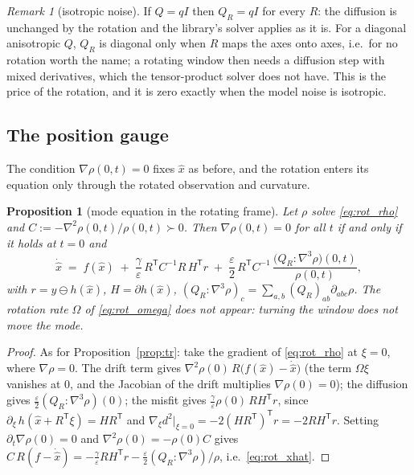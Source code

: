 \documentclass[11pt,a4paper]{article}
\newcommand{\T}{^{\mathsf T}}
\newcommand{\xh}{\hat{x}}
\newcommand{\eps}{\varepsilon}
\newcommand{\grad}{\nabla}
\theoremstyle{plain}
\newtheorem{proposition}{Proposition}
\theoremstyle{definition}
\theoremstyle{remark}
\newtheorem{remark}{Remark}
\begin{document}
\begin{remark}[isotropic noise]
If $Q=qI$ then $Q_R=qI$ for every $R$: the diffusion is unchanged by the rotation and the library's solver applies as it is. For a diagonal anisotropic $Q$, $Q_R$ is diagonal only when $R$ maps the axes onto axes, i.e.\ for no rotation worth the name; a rotating window then needs a diffusion step with mixed derivatives, which the tensor-product solver does not have. This is the price of the rotation, and it is zero exactly when the model noise is isotropic.
\end{remark}

\subsection{The position gauge}

The condition $\grad\rho(0,t)=0$ fixes $\xh$ as before, and the rotation enters its equation only through the rotated observation and curvature.

\begin{proposition}[mode equation in the rotating frame]
\label{prop:rot}
Let $\rho$ solve \eqref{eq:rot_rho} and $C:=-\grad^2\rho(0,t)/\rho(0,t)\succ0$. Then $\grad\rho(0,t)=0$ for all $t$ if and only if it holds at $t=0$ and
\begin{equation}
  \boxed{\;
  \dot{\xh} \;=\; f(\xh) \;+\; \frac\gamma\eps\,R\T C^{-1}R\,H\T r \;+\; \frac\eps2\,R\T C^{-1}\,\frac{\big(Q_R\!:\!\grad^3\rho\big)(0,t)}{\rho(0,t)} ,\;}
  \label{eq:rot_xhat}
\end{equation}
with $r=y\ominus h(\xh)$, $H=\partial h(\xh)$, $(Q_R\!:\!\grad^3\rho)_c=\sum_{a,b}(Q_R)_{ab}\partial_{abc}\rho$. The rotation rate $\Omega$ of \eqref{eq:rot_omega} does not appear: turning the window does not move the mode.
\end{proposition}
\begin{proof}
As for Proposition~\ref{prop:tr}: take the gradient of \eqref{eq:rot_rho} at $\xi=0$, where $\grad\rho=0$. The drift term gives $\grad^2\rho(0)\,R\big(f(\xh)-\dot{\xh}\big)$ (the term $\Omega\xi$ vanishes at $0$, and the Jacobian of the drift multiplies $\grad\rho(0)=0$); the diffusion gives $\tfrac\eps2(Q_R\!:\!\grad^3\rho)(0)$; the misfit gives $\tfrac\gamma\eps\rho(0)\,RH\T r$, since $\partial_\xi\,h(\xh+R\T\xi)=HR\T$ and $\grad_\xi d^2|_{\xi=0}=-2(HR\T)\T r=-2RH\T r$. Setting $\partial_t\grad\rho(0)=0$ and $\grad^2\rho(0)=-\rho(0)C$ gives $C\,R(f-\dot{\xh}) = -\tfrac\gamma\eps RH\T r - \tfrac\eps2(Q_R\!:\!\grad^3\rho)/\rho$, i.e.\ \eqref{eq:rot_xhat}.
\end{proof}
\end{document}
